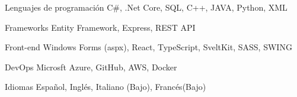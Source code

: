 

\begin{cvskills}
    \cvskill
    {Lenguajes de programación} %
    {C\#, .Net Core, SQL, C++, JAVA, Python, XML} %

    \cvskill
    {Frameworks} %
    {Entity Framework, Express, REST API} %


    \cvskill
    {Front-end} %
    {Windows Forms (aspx), React, TypeScript, SveltKit, SASS, SWING} %

    \cvskill
    {DevOps} %
    {Microsft Azure, GitHub, AWS, Docker} %

    \cvskill
    {Idiomas} %
    {Español, Inglés, Italiano (Bajo), Francés(Bajo) } %
    
   

\end{cvskills}
